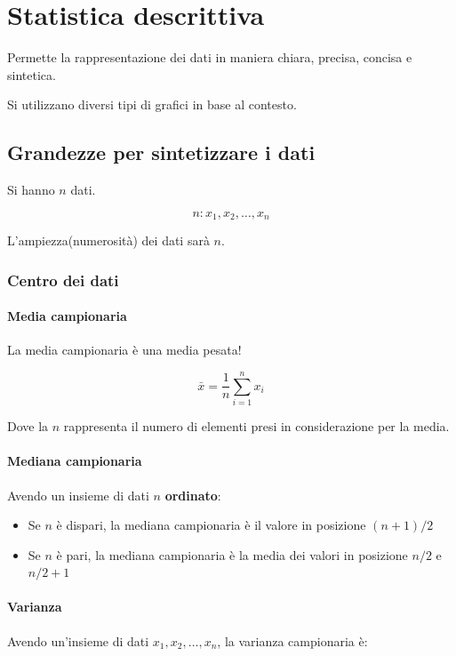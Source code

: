 
\chapter{Statistica descrittiva}

Permette la rappresentazione dei dati in maniera chiara, precisa, concisa e sintetica.

Si utilizzano diversi tipi di grafici in base al contesto.

\section{Grandezze per sintetizzare i dati}

Si hanno $n$ dati.

\begin{equation}
  n : x_1, x_2, \dots, x_n
\end{equation}

L'ampiezza(numerosit\`{a}) dei dati sar\`{a} $n$.
\subsection{Centro dei dati}
\subsubsection{Media campionaria}
La media campionaria \`{e} una media pesata!

\begin{equation}
    \bar{x} = \displaystyle\frac{1}{n} \displaystyle\sum_{i = 1}^{n} x_i
\end{equation}

Dove la $n$ rappresenta il numero di elementi presi in considerazione per la media.

\subsubsection{Mediana campionaria}

Avendo un insieme di dati $n$ \textbf{ordinato}:
\begin{itemize}
    \item Se $n$ è dispari, la mediana campionaria è il valore in posizione $(n + 1) / 2$
    \item Se $n$ è pari, la mediana campionaria è la media dei valori in posizione $n / 2$ e $n / 2 + 1$
\end{itemize}


\subsubsection{Varianza} 
Avendo un'insieme di dati $x_1, x_2, \dots, x_n$, la varianza campionaria è:

